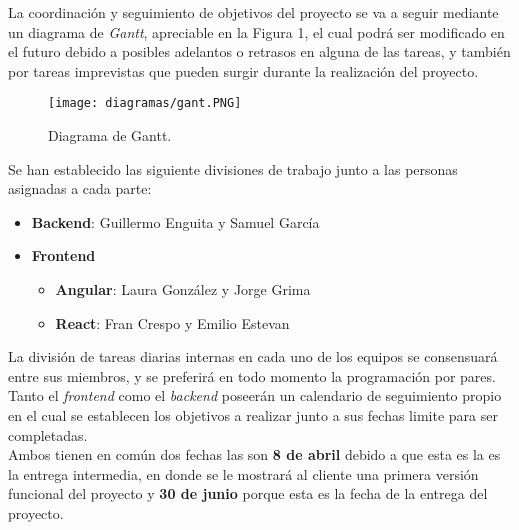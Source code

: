 \documentclass[11pt, a4paper, titlepage]{article}
\begin{document}

La coordinación y seguimiento de objetivos del proyecto se va a seguir mediante un diagrama de \textit{Gantt}, apreciable en la Figura 1, el cual podrá ser modificado en el futuro debido a posibles adelantos o retrasos en alguna de las tareas, y también por tareas imprevistas que pueden surgir durante la realización del proyecto.\\

\begin{landscape}
    \pagestyle{empty}
    \begin{figure}[!p]
    \centering
    \texttt{[image: diagramas/gant.PNG]}
    \caption{Diagrama de Gantt.}
    \label{fig:my_label}
\end{figure}
\end{landscape}

Se han establecido las siguiente divisiones de trabajo junto a las personas asignadas a cada parte:

\begin{itemize}
    \item \textbf{Backend}: Guillermo Enguita y Samuel García
    \item \textbf{Frontend}
    \begin{itemize} 
        \item \textbf{Angular}: Laura González y Jorge Grima
        \item \textbf{React}: Fran Crespo y Emilio Estevan
    \end{itemize}
\end{itemize}

La división de tareas diarias internas en cada uno de los equipos se consensuará entre sus miembros, y se preferirá en todo momento la programación por pares.\\

Tanto el \textit{frontend} como el \textit{backend} poseerán un calendario de seguimiento propio en el cual se establecen los objetivos a realizar junto a sus fechas limite para ser completadas. \\

Ambos tienen en común dos fechas las son \textbf{8 de abril} debido a que esta es la es la entrega intermedia, en donde se le mostrará al cliente una primera versión funcional del proyecto
y \textbf{30 de junio} porque esta es la fecha de la entrega del proyecto.\\
\end{document}
